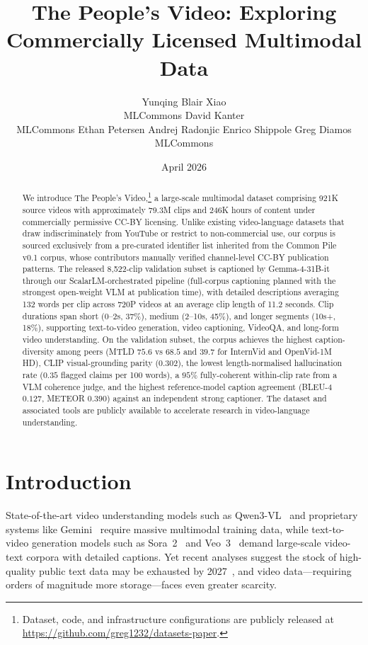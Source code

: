 \documentclass{article}
\title{The People's Video: Exploring Commercially Licensed Multimodal Data}
\author{%
  Yunqing Blair Xiao \\
  MLCommons
  \And
  David Kanter \\
  MLCommons
  \And
  Ethan Petersen
  \And
  Andrej Radonjic
  \And
  Enrico Shippole
  \And
  Greg Diamos \\
  MLCommons
}
\date{April 2026}
\begin{document}
\maketitle

\begin{abstract}
We introduce The People's Video,\footnote{Dataset, code, and infrastructure configurations are publicly released at \url{https://github.com/greg1232/datasets-paper}.} a large-scale multimodal dataset comprising 921K source videos with approximately 79.3M clips and 246K hours of content under commercially permissive CC-BY licensing. Unlike existing video-language datasets that draw indiscriminately from YouTube or restrict to non-commercial use, our corpus is sourced exclusively from a pre-curated identifier list inherited from the Common Pile v0.1 corpus, whose contributors manually verified channel-level CC-BY publication patterns. The released 8{,}522-clip validation subset is captioned by Gemma-4-31B-it through our ScalarLM-orchestrated pipeline (full-corpus captioning planned with the strongest open-weight VLM at publication time), with detailed descriptions averaging 132 words per clip across 720P videos at an average clip length of 11.2 seconds. Clip durations span short (0--2s, 37\%), medium (2--10s, 45\%), and longer segments (10s+, 18\%), supporting text-to-video generation, video captioning, VideoQA, and long-form video understanding. On the validation subset, the corpus achieves the highest caption-diversity among peers (MTLD $75.6$ vs $68.5$ and $39.7$ for InternVid and OpenVid-1M HD), CLIP visual-grounding parity ($0.302$), the lowest length-normalised hallucination rate ($0.35$ flagged claims per 100 words), a $95\%$ fully-coherent within-clip rate from a VLM coherence judge, and the highest reference-model caption agreement (BLEU-4 $0.127$, METEOR $0.390$) against an independent strong captioner. The dataset and associated tools are publicly available to accelerate research in video-language understanding.
\end{abstract}

\section{Introduction}

State-of-the-art video understanding models such as Qwen3-VL~\cite{qwen3vxl} and proprietary systems like Gemini~\cite{gemini2023} require massive multimodal training data, while text-to-video generation models such as Sora~2~\cite{sora2} and Veo~3~\cite{veo3} demand large-scale video-text corpora with detailed captions. Yet recent analyses suggest the stock of high-quality public text data may be exhausted by 2027~\cite{2027AJ}, and video data---requiring orders of magnitude more storage---faces even greater scarcity.
\end{document}

